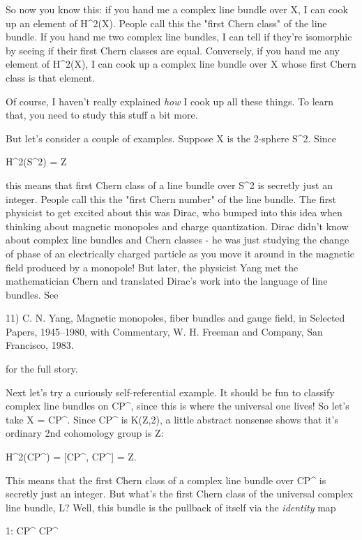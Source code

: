 So now you know this: if you hand me a complex line bundle over X, I can 
cook up an element of H^{2}(X).   People call this the "first Chern class"
of the line bundle.   If you hand me two complex line bundles, I can tell 
if they're isomorphic by seeing if their first Chern classes are equal.  
Conversely, if you hand me any element of H^{2}(X), I can cook up a complex 
line bundle over X whose first Chern class is that element.

Of course, I haven't really explained \emph{how} I cook up all these things.
To learn that, you need to study this stuff a bit more.

But let's consider a couple of examples.  Suppose X is the 2-sphere S^{2}.
Since

H^{2}(S^{2}) = Z

this means that first Chern class of a line bundle over S^{2} is secretly
just an integer.  People call this the "first Chern number" of the line
bundle.  The first physicist to get excited about this was Dirac, who 
bumped into this idea when thinking about magnetic monopoles and charge
quantization.  Dirac didn't know about complex line bundles and Chern 
classes - he was just studying the change of phase of an electrically
charged particle as you move it around in the magnetic field produced by
a monopole!  But later, the physicist Yang met the mathematician Chern
and translated Dirac's work into the language of line bundles.  See

11) C. N. Yang, Magnetic monopoles, fiber bundles and gauge field,
in Selected Papers, 1945--1980, with Commentary, W. H. Freeman and 
Company, San Francisco, 1983.  

for the full story.

Next let's try a curiously self-referential example.  It should be fun 
to classify complex line bundles on CP^{\infty }, since this is where 
the universal one lives!  So let's take X = CP^{\infty }.  Since 
CP^{\infty } is K(Z,2), a little abstract nonsense shows that it's
ordinary 2nd cohomology group is Z:

H^{2}(CP^{\infty }) = [CP^{\infty }, CP^{\infty }] = Z.

This means that the first Chern class of a complex line bundle over 
CP^{\infty } is secretly just an integer.  But what's the first Chern 
class of the universal complex line bundle, L?  Well, this bundle is 
the pullback of itself via the \emph{identity} map

1: CP^{\infty } \to  CP^{\infty }

